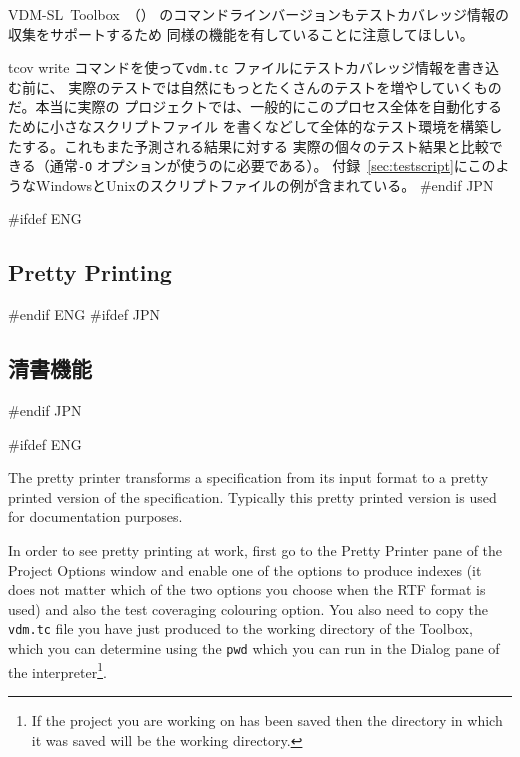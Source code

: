 \documentclass[\pformat,12pt]{article}
\newcommand{\vdmslpp}{VDM-SL}
\newcommand{\Toolbox}{Toolbox}
\newcommand{\vdmslpp}{VDM++}
\newcommand{\Toolbox}{Toolbox}
\newcommand{\guicmd}[1]{{\sf #1}}
\newcommand{\guicmd}[1]{{\gt #1}}
\begin{document}
\vdmslpp\ \Toolbox\ （）
のコマンドラインバージョンもテストカバレッジ情報の収集をサポートするため
同様の機能を有していることに注意してほしい。

\guicmd{tcov write} コマンドを使って\texttt{vdm.tc} ファイルにテストカバレッジ情報を書き込む前に、
実際のテストでは自然にもっとたくさんのテストを増やしていくものだ。本当に実際の
プロジェクトでは、一般的にこのプロセス全体を自動化するために小さなスクリプトファイル
を書くなどして全体的なテスト環境を構築したする。これもまた予測される結果に対する
実際の個々のテスト結果と比較できる（通常{\tt -O} オプションが使うのに必要である）。
付録~\ref{sec:testscript}にこのようなWindowsとUnixのスクリプトファイルの例が含まれている。
#endif JPN

#ifdef ENG
\subsection{Pretty Printing}\label{subsec:pp}
#endif ENG
#ifdef JPN
\subsection{清書機能}\label{subsec:pp}
#endif JPN

#ifdef ENG

The pretty printer transforms a specification from its input format to
a pretty printed version of the specification. Typically this pretty
printed version is used for documentation purposes.

In order to see pretty printing at work, first go to the \guicmd{Pretty
Printer} pane of the \guicmd{Project Options} window and enable one of the
options to produce indexes (it does not matter which of the 
two options you choose when the RTF format is used) and also the test
coveraging colouring option. You also need to copy the {\tt vdm.tc}
file you have just produced to the working directory of the
\Toolbox, which you can determine using the {\tt pwd}
which you can run in the \guicmd{Dialog} pane of the
interpreter\footnote{If the project you are working on has been saved
  then the directory in which it was saved will be the working
  directory.}.
\end{document}

